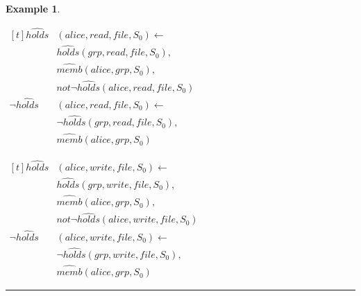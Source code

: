 \documentclass[10pt, twocolumn]{article}
\newtheorem{examp}{Example}
\newenvironment{example}{\begin{examp}\rm}{\rule{2mm}{2mm}\end{examp}}
\begin{document}
\begin{example}
\begin{enumerate}
              \begin{math}
                \begin{aligned}[t]
                  \hat{holds}&(alice, read, file, S_{0}) \leftarrow \\
                  & \hat{holds}(grp, read, file, S_{0}), \\
                  & \hat{memb}(alice, grp, S_{0}), \\
                  & not \lnot \hat{holds}(alice, read, file, S_{0}) \\
                  \lnot \hat{holds}&(alice, read, file, S_{0}) \leftarrow \\
                  & \lnot \hat{holds}(grp, read, file, S_{0}), \\
                  & \hat{memb}(alice, grp, S_{0})
                \end{aligned}
              \end{math}

              \begin{math}
                \begin{aligned}[t]
                  \hat{holds}&(alice, write, file, S_{0}) \leftarrow \\
                  & \hat{holds}(grp, write, file, S_{0}), \\
                  & \hat{memb}(alice, grp, S_{0}), \\
                  & not \lnot \hat{holds}(alice, write, file, S_{0}) \\
                  \lnot \hat{holds}&(alice, write, file, S_{0}) \leftarrow \\
                  & \lnot \hat{holds}(grp, write, file, S_{0}), \\
                  & \hat{memb}(alice, grp, S_{0})
                \end{aligned}
              \end{math}


\end{enumerate}
\end{example}
\end{document}

